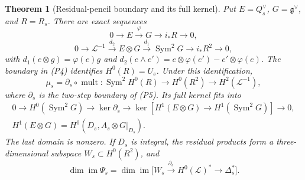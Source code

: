\documentclass[11pt]{article}
\newtheorem{theorem}{Theorem}[section]
\theoremstyle{definition}\newtheorem{definition}[theorem]{Definition}
\theoremstyle{remark}\newtheorem{remark}[theorem]{Remark}
\begin{document}
\begin{theorem}[Residual-pencil boundary and its full kernel]\label{thm:boundary}
Put $E=Q_s^\vee$, $G=\mathfrak g^\vee$, and $R=R_s$. There are exact sequences
\[
 0\to E\xrightarrow{\varphi}G\to i_*R\to0,                  \tag{P4}
\]
\[
 0\to\mathcal L^{-1}\xrightarrow{d_2}E\otimes G
 \xrightarrow{d_1}\operatorname{Sym}^2G\to i_*R^2\to0,       \tag{P5}
\]
with $d_1(e\otimes g)=\varphi(e)g$ and
$d_2(e\wedge e')=e\otimes\varphi(e')-e'\otimes\varphi(e)$.
The boundary in (P4) identifies $H^0(R)=U_s$. Under this identification,
\[
 \mu_s=\partial_s\circ\operatorname{mult}:
 \operatorname{Sym}^2H^0(R)\to H^0(R^2)\to H^2(\mathcal L^{-1}), \tag{P6}
\]
where $\partial_s$ is the two-step boundary of (P5). Its full kernel fits into
\[
\begin{split}
 0\to H^0(\operatorname{Sym}^2G)\to\ker\partial_s
 \to\ker[H^1(E\otimes G)\to H^1(\operatorname{Sym}^2G)]\to0,\\
 H^1(E\otimes G)=H^0(D_s,A_s\otimes G|_{D_s}).
\end{split}\tag{P7}
\]
The last domain is nonzero. If $D_s$ is integral, the residual products form a three-dimensional subspace $W_s\subset H^0(R^2)$, and
\[
 \dim\operatorname{im}\Psi_s
 =\dim\operatorname{im}\bigl[W_s\xrightarrow{\partial_s}
       H^0(\mathcal L)^*\longrightarrow\Delta_s^*\bigr].     \tag{P8}
\]
\end{theorem}
\end{document}
